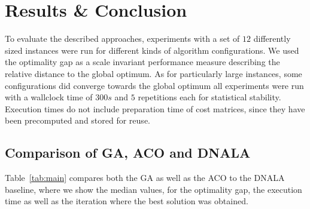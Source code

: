 \documentclass[12pt]{article}
\begin{document}
\section{Results \& Conclusion}
To evaluate the described approaches, experiments with a set of $12$ differently sized instances were run for different kinds of algorithm configurations. 
We used the optimality gap as a scale invariant performance measure describing the relative distance to the global optimum. 
As for particularly large instances, some configurations did converge towards the global optimum all experiments were run with a wallclock time of $300 s$ and $5$ repetitions each for statistical stability. Execution times do not include preparation time of cost matrices, since they have been precomputed and stored for reuse.

\subsection{Comparison of GA, ACO and DNALA}

Table~\ref{tab:main} compares both the GA as well as the ACO to the DNALA baseline, where we show the median values, for the optimality gap, the execution time as well as the iteration where the best solution was obtained. 
\end{document}
